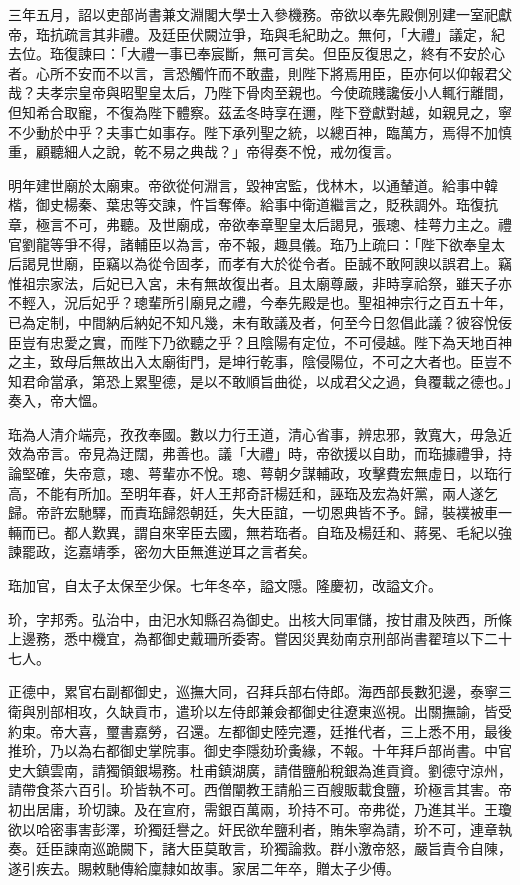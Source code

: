 \begin{pinyinscope}
三年五月，詔以吏部尚書兼文淵閣大學士入參機務。帝欲以奉先殿側別建一室祀獻帝，珤抗疏言其非禮。及廷臣伏闕泣爭，珤與毛紀助之。無何，「大禮」議定，紀去位。珤復諫曰：「大禮一事已奉宸斷，無可言矣。但臣反復思之，終有不安於心者。心所不安而不以言，言恐觸忤而不敢盡，則陛下將焉用臣，臣亦何以仰報君父哉？夫孝宗皇帝與昭聖皇太后，乃陛下骨肉至親也。今使疏賤讒佞小人輒行離間，但知希合取寵，不復為陛下體察。茲孟冬時享在邇，陛下登獻對越，如親見之，寧不少動於中乎？夫事亡如事存。陛下承列聖之統，以總百神，臨萬方，焉得不加慎重，顧聽細人之說，乾不易之典哉？」帝得奏不悅，戒勿復言。

明年建世廟於太廟東。帝欲從何淵言，毀神宮監，伐林木，以通輦道。給事中韓楷，御史楊秦、葉忠等交諫，忤旨奪俸。給事中衛道繼言之，貶秩調外。珤復抗章，極言不可，弗聽。及世廟成，帝欲奉章聖皇太后謁見，張璁、桂萼力主之。禮官劉龍等爭不得，諸輔臣以為言，帝不報，趣具儀。珤乃上疏曰：「陛下欲奉皇太后謁見世廟，臣竊以為從令固孝，而孝有大於從令者。臣誠不敢阿諛以誤君上。竊惟祖宗家法，后妃已入宮，未有無故復出者。且太廟尊嚴，非時享祫祭，雖天子亦不輕入，況后妃乎？璁輩所引廟見之禮，今奉先殿是也。聖祖神宗行之百五十年，已為定制，中間納后納妃不知凡幾，未有敢議及者，何至今日忽倡此議？彼容悅佞臣豈有忠愛之實，而陛下乃欲聽之乎？且陰陽有定位，不可侵越。陛下為天地百神之主，致母后無故出入太廟街門，是坤行乾事，陰侵陽位，不可之大者也。臣豈不知君命當承，第恐上累聖德，是以不敢順旨曲從，以成君父之過，負覆載之德也。」奏入，帝大慍。

珤為人清介端亮，孜孜奉國。數以力行王道，清心省事，辨忠邪，敦寬大，毋急近效為帝言。帝見為迂闊，弗善也。議「大禮」時，帝欲援以自助，而珤據禮爭，持論堅確，失帝意，璁、萼輩亦不悅。璁、萼朝夕謀輔政，攻擊費宏無虛日，以珤行高，不能有所加。至明年春，奸人王邦奇訐楊廷和，誣珤及宏為奸黨，兩人遂乞歸。帝許宏馳驛，而責珤歸怨朝廷，失大臣誼，一切恩典皆不予。歸，裝襆被車一輛而已。都人歎異，謂自來宰臣去國，無若珤者。自珤及楊廷和、蔣冕、毛紀以強諫罷政，迄嘉靖季，密勿大臣無進逆耳之言者矣。

珤加官，自太子太保至少保。七年冬卒，謚文隱。隆慶初，改謚文介。

玠，字邦秀。弘治中，由汜水知縣召為御史。出核大同軍儲，按甘肅及陜西，所條上邊務，悉中機宜，為都御史戴珊所委寄。嘗因災異劾南京刑部尚書翟瑄以下二十七人。

正德中，累官右副都御史，巡撫大同，召拜兵部右侍郎。海西部長數犯邊，泰寧三衛與別部相攻，久缺貢市，遣玠以左侍郎兼僉都御史往遼東巡視。出關撫諭，皆受約束。帝大喜，璽書嘉勞，召還。左都御史陸完遷，廷推代者，三上悉不用，最後推玠，乃以為右都御史掌院事。御史李隱劾玠夤緣，不報。十年拜戶部尚書。中官史大鎮雲南，請獨領銀場務。杜甫鎮湖廣，請借鹽船稅銀為進貢資。劉德守涼州，請帶食茶六百引。玠皆執不可。西僧闡教王請船三百艘販載食鹽，玠極言其害。帝初出居庸，玠切諫。及在宣府，需銀百萬兩，玠持不可。帝弗從，乃進其半。王瓊欲以哈密事害彭澤，玠獨廷譽之。奸民欲牟鹽利者，賄朱寧為請，玠不可，連章執奏。廷臣諫南巡跪闕下，諸大臣莫敢言，玠獨論救。群小激帝怒，嚴旨責令自陳，遂引疾去。賜敕馳傳給廩隸如故事。家居二年卒，贈太子少傅。


\end{pinyinscope}
